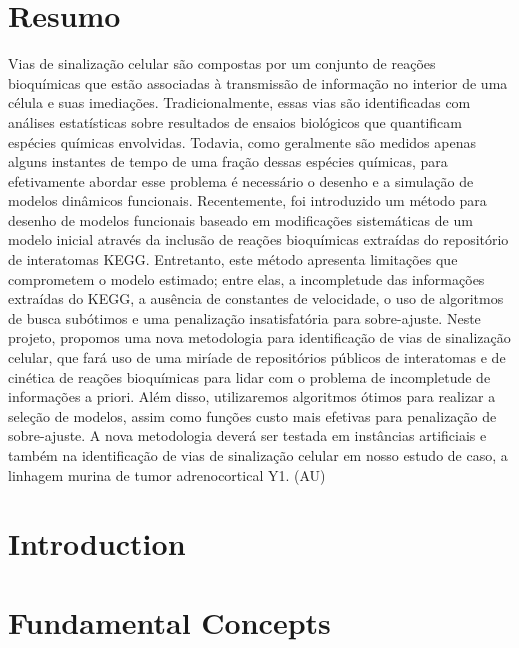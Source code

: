 \documentclass[12pt, twoside]{report}
\numberwithin{mydefinition}{section}
\numberwithin{mytheorem}{section}
\numberwithin{mylemma}{section}
\numberwithin{corollary}{section}
\begin{document}
\chapter*{Resumo}
Vias de sinalização celular são compostas por um conjunto de reações
bioquímicas que estão associadas à transmissão de informação no interior
de uma célula e suas imediações. Tradicionalmente, essas vias são
identificadas com análises estatísticas sobre resultados de ensaios
biológicos que quantificam espécies químicas envolvidas. Todavia, como
geralmente são medidos apenas alguns instantes de tempo de uma fração
dessas espécies químicas, para efetivamente abordar esse problema é
necessário o desenho e a simulação de modelos dinâmicos funcionais.
Recentemente, foi introduzido um método para desenho de modelos
funcionais baseado em modificações sistemáticas de um modelo inicial
através da inclusão de reações bioquímicas extraídas do repositório de
interatomas KEGG. Entretanto, este método apresenta limitações que
comprometem o modelo estimado; entre elas, a incompletude das
informações extraídas do KEGG, a ausência de constantes de velocidade, o
uso de algoritmos de busca subótimos e uma penalização insatisfatória
para sobre-ajuste. Neste projeto, propomos uma nova metodologia para
identificação de vias de sinalização celular, que fará uso de uma
miríade de repositórios públicos de interatomas e de cinética de reações
bioquímicas para lidar com o problema de incompletude de informações a
priori. Além disso, utilizaremos algoritmos ótimos para realizar a
seleção de modelos, assim como funções custo mais efetivas para
penalização de sobre-ajuste. A nova metodologia deverá ser testada em
instâncias artificiais e também na identificação de vias de sinalização
celular em nosso estudo de caso, a linhagem murina de tumor
adrenocortical Y1. (AU)
 
\tableofcontents

\clearpage
{} 

\nocite{*}
\chapter{Introduction}
\label{chap:intro}


\chapter{Fundamental Concepts}
\label{chap:fundamental_concepts}

\end{document}

